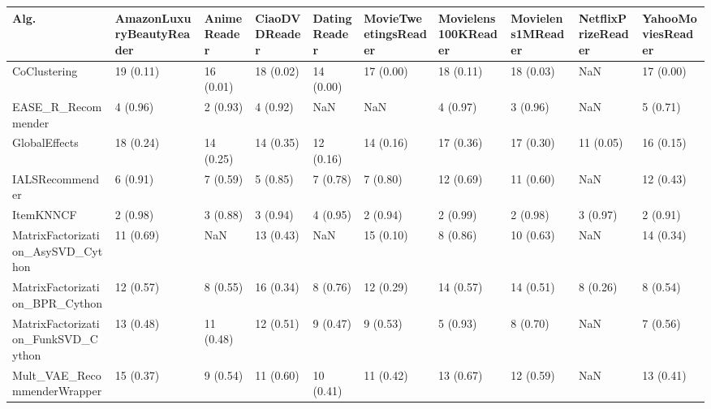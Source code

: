 \begin{tabular}{llllllllll}
\toprule
                               Alg. & AmazonLuxuryBeautyReader & AnimeReader & CiaoDVDReader & DatingReader & MovieTweetingsReader & Movielens100KReader & Movielens1MReader & NetflixPrizeReader & YahooMoviesReader \\
\midrule
                       CoClustering &                19 (0.11) &   16 (0.01) &     18 (0.02) &    14 (0.00) &            17 (0.00) &           18 (0.11) &         18 (0.03) &                NaN &         17 (0.00) \\
                 EASE\_R\_Recommender &                 4 (0.96) &    2 (0.93) &      4 (0.92) &          NaN &                  NaN &            4 (0.97) &          3 (0.96) &                NaN &          5 (0.71) \\
                      GlobalEffects &                18 (0.24) &   14 (0.25) &     14 (0.35) &    12 (0.16) &            14 (0.16) &           17 (0.36) &         17 (0.30) &          11 (0.05) &         16 (0.15) \\
                    IALSRecommender &                 6 (0.91) &    7 (0.59) &      5 (0.85) &     7 (0.78) &             7 (0.80) &           12 (0.69) &         11 (0.60) &                NaN &         12 (0.43) \\
                          ItemKNNCF &                 2 (0.98) &    3 (0.88) &      3 (0.94) &     4 (0.95) &             2 (0.94) &            2 (0.99) &          2 (0.98) &           3 (0.97) &          2 (0.91) \\
  MatrixFactorization\_AsySVD\_Cython &                11 (0.69) &         NaN &     13 (0.43) &          NaN &            15 (0.10) &            8 (0.86) &         10 (0.63) &                NaN &         14 (0.34) \\
     MatrixFactorization\_BPR\_Cython &                12 (0.57) &    8 (0.55) &     16 (0.34) &     8 (0.76) &            12 (0.29) &           14 (0.57) &         14 (0.51) &           8 (0.26) &          8 (0.54) \\
 MatrixFactorization\_FunkSVD\_Cython &                13 (0.48) &   11 (0.48) &     12 (0.51) &     9 (0.47) &             9 (0.53) &            5 (0.93) &          8 (0.70) &                NaN &          7 (0.56) \\
        Mult\_VAE\_RecommenderWrapper &                15 (0.37) &    9 (0.54) &     11 (0.60) &    10 (0.41) &            11 (0.42) &           13 (0.67) &         12 (0.59) &                NaN &         13 (0.41) \\

\end{tabular}
